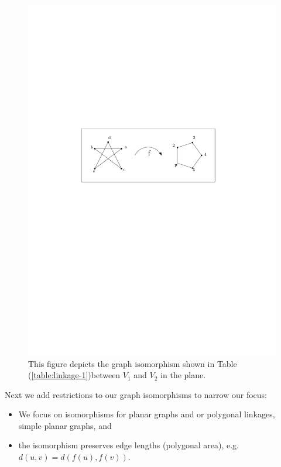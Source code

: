 \begin{figure}[!h]
\begin{center}
\includegraphics[scale=1]{graphics/graphIsomorphismExample.pdf}
\end{center} 
\caption{This figure depicts the graph isomorphism shown in Table (\ref{table:linkage-1})between 
$V_1$ and $V_2$ in the plane.}
\label{fig:linkage-3}
\end{figure}
Next we add restrictions to our graph isomorphisms to narrow our focus:
\begin{itemize}
\item[\rn{1}] We focus on isomorphisms for planar graphs and or polygonal linkages, simple planar graphs, and
\item[\rn{2}] the isomorphism preserves edge lengths (polygonal area), e.g. $d(u,v) = d(f(u),f(v))$.
\end{itemize}  

